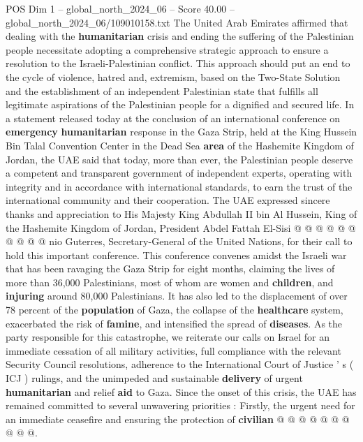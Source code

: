 \begin{textsample}{POS Dim 1 – global\_north\_2024\_06 – Score 40.00 – global\_north\_2024\_06/109010158.txt}  \label{ex:f1_pos_236}
The United Arab Emirates affirmed that dealing with the \textbf{humanitarian} crisis and ending the suffering of the Palestinian people necessitate adopting a comprehensive strategic approach to ensure a resolution to the Israeli-Palestinian conflict.
This approach should put an end to the cycle of violence, hatred and, extremism, based on the Two-State Solution and the establishment of an independent Palestinian state that fulfills all legitimate aspirations of the Palestinian people for a dignified and secured life.
In a statement released today at the conclusion of an international conference on \textbf{emergency} \textbf{humanitarian} response in the Gaza Strip, held at the King Hussein Bin Talal Convention Center in the Dead Sea \textbf{area} of the Hashemite Kingdom of Jordan, the UAE said that today, more than ever, the Palestinian people deserve a competent and transparent government of independent experts, operating with integrity and in accordance with international standards, to earn the trust of the international community and their cooperation.
The UAE expressed sincere thanks and appreciation to His Majesty King Abdullah II bin Al Hussein, King of the Hashemite Kingdom of Jordan, President Abdel Fattah El-Sisi @ @ @ @ @ @ @ @ @ @ nio Guterres, Secretary-General of the United Nations, for their call to hold this important conference.
This conference convenes amidst the Israeli war that has been ravaging the Gaza Strip for eight months, claiming the lives of more than 36,000 Palestinians, most of whom are women and \textbf{children}, and \textbf{injuring} around 80,000 Palestinians.
It has also led to the displacement of over 78 percent of the \textbf{population} of Gaza, the collapse of the \textbf{healthcare} system, exacerbated the risk of \textbf{famine}, and intensified the spread of \textbf{diseases}.
As the party responsible for this catastrophe, we reiterate our calls on Israel for an immediate cessation of all military activities, full compliance with the relevant Security Council resolutions, adherence to the International Court of Justice ' s ( ICJ ) rulings, and the unimpeded and sustainable \textbf{delivery} of urgent \textbf{humanitarian} and relief \textbf{aid} to Gaza.
Since the onset of this crisis, the UAE has remained committed to several unwavering priorities : Firstly, the urgent need for an immediate ceasefire and ensuring the protection of \textbf{civilian} @ @ @ @ @ @ @ @ @ @.

\end{textsample}
